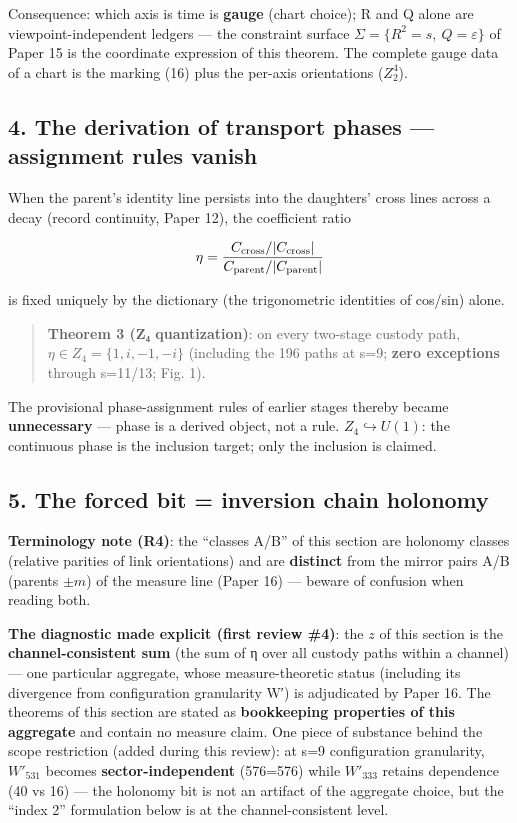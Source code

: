 \documentclass[
]{article}
\begin{document}
Consequence: which axis is time is \textbf{gauge} (chart choice); R and
Q alone are viewpoint-independent ledgers --- the constraint surface
\(\Sigma=\{R^2=s,\ Q=\varepsilon\}\) of Paper 15 is the coordinate
expression of this theorem. The complete gauge data of a chart is the
marking (16) plus the per-axis orientations (\(Z_2^{4}\)).

\subsection{4. The derivation of transport phases --- assignment rules
vanish}\label{the-derivation-of-transport-phases-assignment-rules-vanish}

When the parent's identity line persists into the daughters' cross lines
across a decay (record continuity, Paper 12), the coefficient ratio

\[
\eta=\frac{C_{\rm cross}/|C_{\rm cross}|}{C_{\rm parent}/|C_{\rm parent}|}
\]

is fixed uniquely by the dictionary (the trigonometric identities of
cos/sin) alone.

\begin{quote}
\textbf{Theorem 3 (Z₄ quantization)}: on every two-stage custody path,
\(\eta\in Z_4=\{1,i,-1,-i\}\) (including the 196 paths at s=9;
\textbf{zero exceptions} through s=11/13; Fig. 1).
\end{quote}

The provisional phase-assignment rules of earlier stages thereby became
\textbf{unnecessary} --- phase is a derived object, not a rule.
\(Z_4\hookrightarrow U(1)\): the continuous phase is the inclusion
target; only the inclusion is claimed.

\subsection{5. The forced bit = inversion chain
holonomy}\label{the-forced-bit-inversion-chain-holonomy}

\textbf{Terminology note (R4)}: the ``classes A/B'' of this section are
holonomy classes (relative parities of link orientations) and are
\textbf{distinct} from the mirror pairs A/B (parents \(\pm m\)) of the
measure line (Paper 16) --- beware of confusion when reading both.

\textbf{The diagnostic made explicit (first review \#4)}: the \(z\) of
this section is the \textbf{channel-consistent sum} (the sum of η over
all custody paths within a channel) --- one particular aggregate, whose
measure-theoretic status (including its divergence from configuration
granularity W′) is adjudicated by Paper 16. The theorems of this section
are stated as \textbf{bookkeeping properties of this aggregate} and
contain no measure claim. One piece of substance behind the scope
restriction (added during this review): at s=9 configuration
granularity, \(W'_{531}\) becomes \textbf{sector-independent} (576=576)
while \(W'_{333}\) retains dependence (40 vs 16) --- the holonomy bit is
not an artifact of the aggregate choice, but the ``index 2'' formulation
below is at the channel-consistent level.
\end{document}
